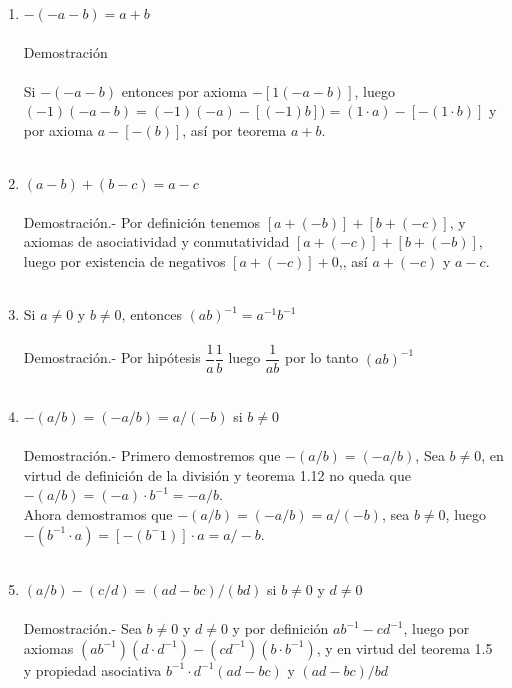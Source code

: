\begin{enumerate}
\item $-(-a-b)=a+b$\\\\
Demostración\\\\
Si $-(-a-b)$ entonces por axioma $-\left[1(-a-b)\right]$, luego $(-1)(-a-b)=(-1)(-a)-\left[(-1)b\right])= (1\cdot a)-\left[-(1\cdot b)\right]$ y por axioma $a - \left[ - (b)\right]$, así por teorema $a+b$.\\\\

\item $(a-b)+(b-c)=a-c$\\\\
Demostración.- \;
Por definición tenemos $\left[ a+(-b) \right]+\left[ b+(-c) \right]$, y axiomas de asociatividad y conmutatividad $\left[ a+(-c) \right]+\left[ b+(-b) \right]$, luego por existencia de negativos  $\left[ a+(-c) \right] + 0$,, así $a+(-c)$ y $a-c$. \\\\

\item Si $a\neq 0$ y $b\neq 0$, entonces $(ab)^{-1} = a^{-1} b^{-1}$\\\\
Demostración.- \; Por hipótesis $\dfrac{1}{a} \dfrac{1}{b}$ luego $\dfrac{1}{ab}$ por lo tanto $(ab)^{-1}$\\\\

\item $-(a/b)=(-a/b)=a/(-b)$ si $b\neq 0$\\\\
Demostración.- \;
Primero demostremos que $-(a/b)=(-a/b)$, Sea $b\neq 0$, en virtud de definición de la división y teorema 1.12 no queda que $-(a/b)=(-a)\cdot b^{-1}=-a/b$.\\
Ahora demostramos que $-(a/b)=(-a/b)=a/(-b)$, sea $b\neq0$, luego $-(b^{-1}\cdot a)=\left[-(b^-1)\right]\cdot a = a/-b$. \\\\

\item $(a/b)-(c/d)=(ad-bc)/(bd)$ si $b\neq 0$ y $d\neq 0$\\\\
Demostración.- \;
Sea $b\neq 0$ y $d\neq 0$ y por definición $ab^{-1}-cd^{-1}$, luego por axiomas $(ab^{-1})(d\cdot d^{-1})-(cd^{-1})(b\cdot b^{-1})$, y en virtud del teorema 1.5 y propiedad asociativa $b^{-1}\cdot d^{-1}(ad-bc)$ y $(ad-bc)/bd$\\\\
\end{enumerate}

